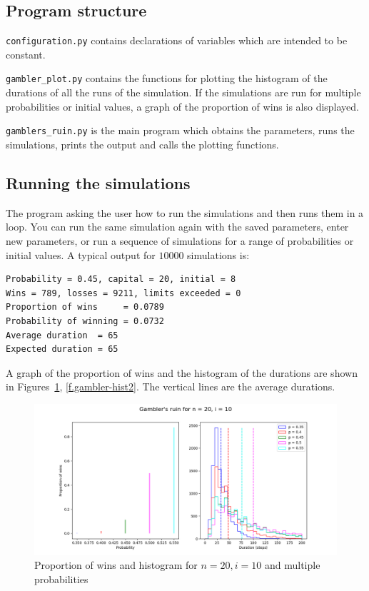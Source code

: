 \subsection{Program structure}

\verb+configuration.py+ contains declarations of variables which are intended to be constant.

\verb+gambler_plot.py+ contains the functions for plotting the histogram of the durations of all the runs of the simulation. If the simulations are run for multiple probabilities or initial values, a graph of the proportion of wins is also displayed.

\verb+gamblers_ruin.py+ is the main program which obtains the parameters, runs the simulations, prints the output and calls the plotting functions.

\subsection{Running the simulations}

The program asking the user how to run the simulations and then runs them in a loop. You can run the same simulation again with the saved parameters, enter new parameters, or run a sequence of simulations for a range of probabilities or initial values. A typical output for $10000$ simulations is:
\begin{verbatim}
Probability = 0.45, capital = 20, initial = 8
Wins = 789, losses = 9211, limits exceeded = 0
Proportion of wins     = 0.0789
Probability of winning = 0.0732
Average duration  = 65
Expected duration = 65
\end{verbatim}
A graph of the proportion of wins and the histogram of the durations are shown in Figures~\ref{f.gambler-hist1}, \ref{f.gambler-hist2}. The vertical lines are the average durations.

\begin{figure}
\begin{center}
\includegraphics[width=\textwidth]{gamblers-ruin-01}
\caption{Proportion of wins and histogram for $n=20, i=10$ and multiple probabilities}\label{f.gambler-hist1}
\end{center}
\end{figure}


